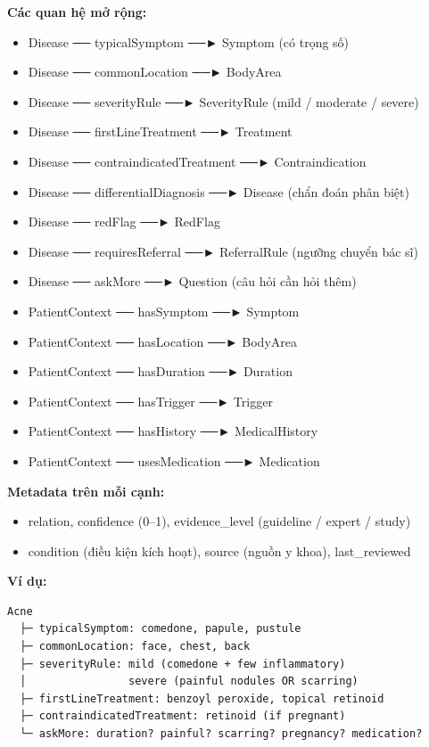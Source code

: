 \documentclass[12pt,a4paper]{article}
\begin{document}
\textbf{Các quan hệ mở rộng:}
\begin{itemize}
    \item Disease ── typicalSymptom ──► Symptom (có trọng số)
    \item Disease ── commonLocation ──► BodyArea
    \item Disease ── severityRule ──► SeverityRule (mild / moderate / severe)
    \item Disease ── firstLineTreatment ──► Treatment
    \item Disease ── contraindicatedTreatment ──► Contraindication
    \item Disease ── differentialDiagnosis ──► Disease (chẩn đoán phân biệt)
    \item Disease ── redFlag ──► RedFlag
    \item Disease ── requiresReferral ──► ReferralRule (ngưỡng chuyển bác sĩ)
    \item Disease ── askMore ──► Question (câu hỏi cần hỏi thêm)
    \item PatientContext ── hasSymptom ──► Symptom
    \item PatientContext ── hasLocation ──► BodyArea
    \item PatientContext ── hasDuration ──► Duration
    \item PatientContext ── hasTrigger ──► Trigger
    \item PatientContext ── hasHistory ──► MedicalHistory
    \item PatientContext ── usesMedication ──► Medication
\end{itemize}

\textbf{Metadata trên mỗi cạnh:}
\begin{itemize}
    \item relation, confidence (0--1), evidence\_level (guideline / expert / study)
    \item condition (điều kiện kích hoạt), source (nguồn y khoa), last\_reviewed
\end{itemize}

\textbf{Ví dụ:}
\begin{verbatim}
Acne
  ├─ typicalSymptom: comedone, papule, pustule
  ├─ commonLocation: face, chest, back
  ├─ severityRule: mild (comedone + few inflammatory)
  │                severe (painful nodules OR scarring)
  ├─ firstLineTreatment: benzoyl peroxide, topical retinoid
  ├─ contraindicatedTreatment: retinoid (if pregnant)
  └─ askMore: duration? painful? scarring? pregnancy? medication?
\end{verbatim}
\end{document}
